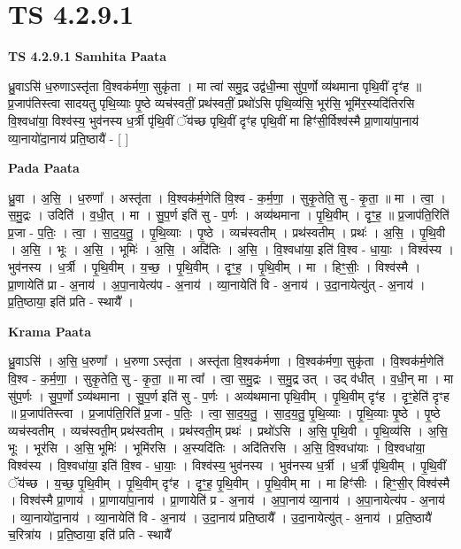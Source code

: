 \documentclass[17pt]{extarticle}
\begin{document}
\section{ TS 4.2.9.1 }

\textbf{TS 4.2.9.1 } \newline
\textbf{Samhita Paata} \newline

ध्रु॒वाऽसि॑ ध॒रुणाऽस्तृ॑ता वि॒श्वक॑र्मणा॒ सुकृ॑ता । मा त्वा॑ समु॒द्र उद्व॑धी॒न्मा सु॑प॒र्णो व्य॑थमाना पृथि॒वीं दृꣳ॑ह ॥ प्र॒जाप॑तिस्त्वा सादयतु पृथि॒व्याः पृ॒ष्ठे व्यच॑स्वतीं॒ प्रथ॑स्वतीं॒ प्रथो॑ऽसि पृथि॒व्य॑सि॒ भूर॑सि॒ भूमि॑र॒स्यदि॑तिरसि वि॒श्वधा॑या॒ विश्व॑स्य॒ भुव॑नस्य ध॒र्त्री पृ॑थि॒वीं ॅय॑च्छ पृथि॒वीं दृꣳ॑ह पृथि॒वीं मा हिꣳ॑सी॒र्विश्व॑स्मै प्रा॒णाया॑पा॒नाय॑ व्या॒नायो॑दा॒नाय॑ प्रति॒ष्ठायै॑ - [  ] \newline

\textbf{Pada Paata} \newline

ध्रु॒वा । अ॒सि॒ । ध॒रुणा᳚ । अस्तृ॑ता । वि॒श्वक॑र्म॒णेति॑ वि॒श्व - क॒र्म॒णा॒ । सुकृ॒तेति॒ सु - कृ॒ता॒ ॥ मा । त्वा॒ । स॒मु॒द्रः । उदिति॑ । व॒धी॒त् । मा । सु॒प॒र्ण इति॑ सु - प॒र्णः । अव्य॑थमाना । पृ॒थि॒वीम् । दृꣳ॒॒ह॒ ॥ प्र॒जाप॑ति॒रिति॑ प्र॒जा - प॒तिः॒ । त्वा॒ । सा॒द॒य॒तु॒ । पृ॒थि॒व्याः । पृ॒ष्ठे । व्यच॑स्वतीम् । प्रथ॑स्वतीम् । प्रथः॑ । अ॒सि॒ । पृ॒थि॒वी । अ॒सि॒ । भूः । अ॒सि॒ । भूमिः॑ । अ॒सि॒ । अदि॑तिः । अ॒सि॒ । वि॒श्वधा॑या॒ इति॑ वि॒श्व - धा॒याः॒ । विश्व॑स्य । भुव॑नस्य । ध॒र्त्री । पृ॒थि॒वीम् । य॒च्छ॒ । पृ॒थि॒वीम् । दृꣳ॒॒ह॒ । पृ॒थि॒वीम् । मा । हिꣳ॒॒सीः॒ । विश्व॑स्मै । प्रा॒णायेति॑ प्रा - अ॒नाय॑ । अ॒पा॒नायेत्य॑प - अ॒नाय॑ । व्या॒नायेति॑ वि - अ॒नाय॑ । उ॒दा॒नायेत्यु॑त् - अ॒नाय॑ । प्र॒ति॒ष्ठाया॒ इति॑ प्रति - स्थायै᳚ ।  \newline


\textbf{Krama Paata} \newline

ध्रु॒वाऽसि॑ । अ॒सि॒ ध॒रुणा᳚ । ध॒रुणा ऽस्तृ॑ता । अस्तृ॑ता वि॒श्वक॑र्मणा । वि॒श्वक॑र्मणा॒ सुकृ॑ता । वि॒श्वक॑र्म॒णेति॑ वि॒श्व - क॒र्म॒णा॒ । सुकृ॒तेति॒ सु - कृ॒ता॒ ॥ मा त्वा᳚ । त्वा॒ स॒मु॒द्रः । स॒मु॒द्र उत् । उद् व॑धीत् । व॒धी॒न् मा । मा सु॑प॒र्णः । सु॒प॒र्णो ऽव्य॑थमाना । सु॒प॒र्ण इति॑ सु - प॒र्णः । अव्य॑थमाना पृथि॒वीम् । पृ॒थि॒वीम् दृꣳ॑ह । दृꣳ॒॒हेति॑ दृꣳह ॥ प्र॒जाप॑तिस्त्वा । प्र॒जाप॑ति॒रिति॑ प्र॒जा - प॒तिः॒ । त्वा॒ सा॒द॒य॒तु॒ । सा॒द॒य॒तु॒ पृ॒थि॒व्याः । पृ॒थि॒व्याः पृ॒ष्ठे । पृ॒ष्ठे व्यच॑स्वतीम् । व्यच॑स्वती॒म् प्रथ॑स्वतीम् । प्रथ॑स्वती॒म् प्रथः॑ । प्रथो॑ऽसि । अ॒सि॒ पृ॒थि॒वी । पृ॒थि॒व्य॑सि । अ॒सि॒ भूः । भूर॑सि । अ॒सि॒ भूमिः॑ । भूमि॑रसि । अ॒स्यदि॑तिः । अदि॑तिरसि । अ॒सि॒ वि॒श्वधा॑याः । वि॒श्वधा॑या॒ विश्व॑स्य । वि॒श्वधा॑या॒ इति॑ वि॒श्व - धा॒याः॒ । विश्व॑स्य॒ भुव॑नस्य । भुव॑नस्य ध॒र्त्री । ध॒र्त्री पृ॑थि॒वीम् । पृ॒थि॒वीं ॅय॑च्छ । य॒च्छ॒ पृ॒थि॒वीम् । पृ॒थि॒वीम् दृꣳ॑ह । दृꣳ॒॒ह॒ पृ॒थि॒वीम् । पृ॒थि॒वीम् मा । मा हिꣳ॑सीः । हिꣳ॒॒सी॒र् विश्व॑स्मै । विश्व॑स्मै प्रा॒णाय॑ । प्रा॒णाया॑पा॒नाय॑ । प्रा॒णायेति॑ प्र - अ॒नाय॑ । अ॒पा॒नाय॑ व्या॒नाय॑ । अ॒पा॒नायेत्य॑प - अ॒नाय॑ । व्या॒नायो॑दा॒नाय॑ । व्या॒नायेति॑ वि - अ॒नाय॑ । उ॒दा॒नाय॑ प्रति॒ष्ठायै᳚ । उ॒दा॒नायेत्यु॑त् - अ॒नाय॑ । प्र॒ति॒ष्ठायै॑ च॒रित्रा॑य । प्र॒ति॒ष्ठाया॒ इति॑ प्रति - स्थायै᳚ \newline
\end{document}
